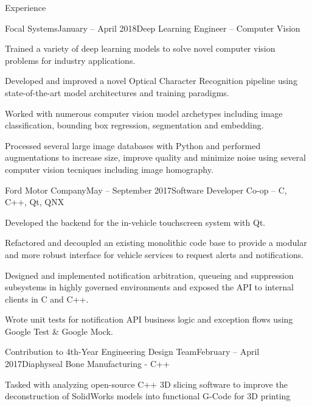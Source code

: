 \documentclass{resume} %
\begin{document}
\begin{rSection}{Experience}

\begin{rSubsection}{Focal Systems}{January -- April 2018}{Deep Learning Engineer -- Computer Vision}{}
	\item Trained a variety of deep learning models to solve novel computer vision problems for industry applications.
	\item Developed and improved a novel Optical Character Recognition pipeline using state-of-the-art model architectures and training paradigms.
	\item Worked with numerous computer vision model archetypes including image classification, bounding box regression, segmentation and embedding.
	\item Processed several large image databases with Python and performed augmentations to increase size, improve quality and minimize noise using several computer vision tecniques including image homography.
\end{rSubsection}

\begin{rSubsection}{Ford Motor Company}{May -- September 2017}{Software Developer Co-op -- C, C++, Qt, QNX}{}

\item Developed the backend for the in-vehicle touchscreen system with Qt. 
\item Refactored and decoupled an existing monolithic code base to provide a modular and more robust interface for vehicle services to request alerts and notifications.
\item Designed and implemented notification arbitration, queueing and suppression subsystems in highly governed environments and exposed the API to internal clients in C and C++.
\item Wrote unit tests for notification API business logic and exception flows using Google Test \& Google Mock.

\end{rSubsection}

\begin{rSubsection}{Contribution to 4th-Year Engineering Design Team}{February -- April 2017}{Diaphyseal Bone Manufacturing - C++}{}
\item Tasked with analyzing open-source C++ 3D slicing software to improve the deconstruction of SolidWorks models into functional G-Code for 3D printing
\end{rSubsection}

\end{rSection}
\end{document}
